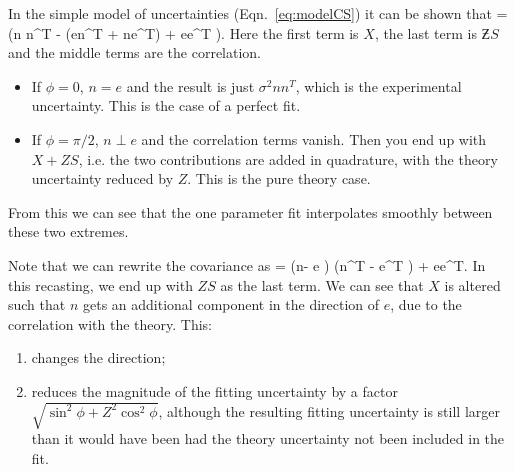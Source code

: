 In the simple model of uncertainties (Eqn.~\ref{eq:modelCS}) it can be shown that
\be 
\Cov[T(\lambda)] =  \bigg(n n^T -  \cos\phi (en^T + ne^T) + ee^T \bigg).
\ee 
Here the first term is $X$, the last term is $\Zbar S$ and the middle terms are the correlation. 
\begin{itemize}
\item If $\phi=0$, $n=e$ and the result is just $\sigma^2 nn^T$, which is the experimental uncertainty. This is the case of a perfect fit.
\item If $\phi=\pi/2$, $n \perp e$ and the correlation terms vanish. Then you end up with $X + ZS$, i.e. the two contributions are added in quadrature, with the theory uncertainty reduced by $Z$. This is the pure theory case.
\end{itemize}
From this we can see that the one parameter fit interpolates smoothly between these two extremes.

Note that we can rewrite the covariance as 
\be 
\Cov[T(\lambda)] =  \bigg(n-  e \bigg) \bigg(n^T -  e^T \bigg) +  ee^T.
\ee
In this recasting, we end up with $ZS$ as the last term. We can see that $X$ is altered such that $n$ gets an additional component in the direction of $e$, due to the correlation with the theory. This:
\begin{enumerate}
\item changes the direction;
\item reduces the magnitude of the fitting uncertainty by a factor $\sqrt{\sin^2 \phi + Z^2 \cos^2 \phi}$, although the resulting fitting uncertainty is still larger than it would have been had the theory uncertainty not been included in the fit.
\end{enumerate}

